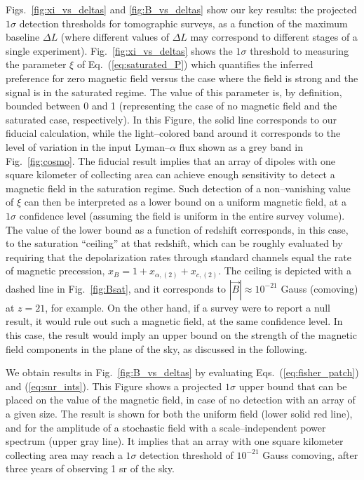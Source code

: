 \documentclass[aps,prd,twocolumn,floatfix,showpacs,superscriptaddress,nofootinbib]{revtex4-1}
\newcommand{\eq}[1]{{Eq.~(#1)}}
\begin{document}
Figs.~\ref{fig:xi_vs_deltas} and \ref{fig:B_vs_deltas} show our key results: the projected $1\sigma$ detection thresholds for tomographic surveys, as a function of the maximum baseline $\Delta L$ (where different values of $\Delta L$ may correspond to different stages of a single experiment). Fig.~\ref{fig:xi_vs_deltas} shows the $1\sigma$ threshold to measuring the parameter $\xi$ of \eq{\ref{eq:saturated_P}} which quantifies the inferred preference for zero magnetic field versus the case where the field is strong and the signal is in the saturated regime. The value of this parameter is, by definition, bounded between 0 and 1 (representing the case of no magnetic field and the saturated case, respectively). In this Figure, the solid line corresponds to our fiducial calculation, while the light--colored band around it corresponds to the level of variation in the input Lyman--$\alpha$ flux shown as a grey band in Fig.~\ref{fig:cosmo}. The fiducial result implies that an array of dipoles with one square kilometer of collecting area can achieve enough sensitivity to detect a magnetic field in the saturation regime. Such detection of a non--vanishing value of $\xi$ can then be interpreted as a lower bound on a uniform magnetic field, at a $1\sigma$ confidence level (assuming the field is uniform in the entire survey volume). The value of the lower bound as a function of redshift  corresponds, in this case, to the saturation ``ceiling'' at that redshift, which can be roughly evaluated by requiring that the depolarization rates through standard channels equal the rate of magnetic precession, $x_B = 1+x_{\alpha ,(2)} +x_{c,(2)}$. The ceiling is depicted with a dashed line in Fig.~\ref{fig:Bsat}, and it corresponds to $|\vec B|\approx10^{-21}$ Gauss (comoving) at $z=21$, for example.  On the other hand, if a survey were to report a null result, it would rule out such a magnetic field, at the same confidence level. In this case, the result would imply an upper bound on the strength of the magnetic field components in the plane of the sky, as discussed in the following. 

We obtain results in Fig.~\ref{fig:B_vs_deltas} by evaluating Eqs.~(\ref{eq:fisher_patch}) and (\ref{eq:snr_ints}). This Figure shows a projected $1\sigma$ upper bound that can be placed on the value of the magnetic field, in case of no detection with an array of a given size. The result is shown for both the uniform field (lower solid red line), and for the amplitude of a stochastic field with a scale--independent power spectrum (upper gray line). It implies that an array with one square kilometer collecting area may reach a $1\sigma$ detection threshold of $10^{-21}$ Gauss comoving, after three years of observing 1 sr of the sky. 
\end{document}
